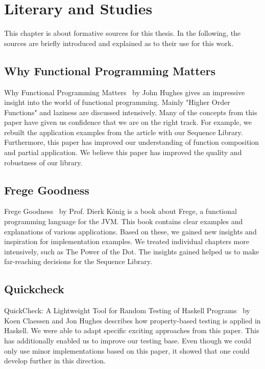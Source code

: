 \section{Literary and Studies}
\label{sec:Literary and Studies}
This chapter is about formative sources for this thesis. In the following, the
sources are briefly introduced and explained as to their use for this work.

\subsection{Why Functional Programming Matters}
\label{sub:Functional Programming Matters}
Why Functional Programming Matters~\cite{hughes_why_1989} by John Hughes gives an 
impressive insight into the world of functional
programming. Mainly "Higher Order Functions" and laziness are discussed
intensively. Many of the concepts from this paper have given us confidence that
we are on the right track. For example, we rebuilt the application examples
from the article with our Sequence Library.
Furthermore, this paper has improved our understanding of function composition
and partial application. We believe this paper has improved the quality and
robustness of our library.

\subsection{Frege Goodness}
\label{sub:Frege Goodness}
Frege Goodness~\cite{frege_goodness} by Prof. Dierk König is a book about Frege, a functional
programming language for the JVM. This book contains clear examples and
explanations of various applications. Based on these, we gained new insights and inspiration for
implementation examples. We treated individual chapters more intensively, such
as The Power of the Dot. The insights gained helped us to make far-reaching
decisions for the Sequence Library.

\subsection{Quickcheck}
\label{sub:Quickcheck}
QuickCheck: A Lightweight Tool for Random Testing
of Haskell Programs~\cite{quickcheck_hughes} by Koen Claessen and Jon Hughes describes how
property-based testing is applied in Haskell. We were able to adapt specific
exciting approaches from this paper. This has additionally enabled us to
improve our testing base. Even though we could only use minor implementations
based on this paper, it showed that one could develop further in this
direction.

